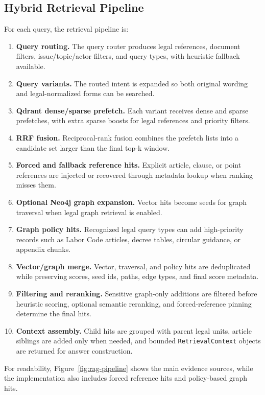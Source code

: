 \subsection{Hybrid Retrieval Pipeline}
For each query, the retrieval pipeline is:

\begin{enumerate}
  \item \textbf{Query routing.} The query router produces legal references, document filters, issue/topic/actor filters, and query types, with heuristic fallback available.
  \item \textbf{Query variants.} The routed intent is expanded so both original wording and legal-normalized forms can be searched.
  \item \textbf{Qdrant dense/sparse prefetch.} Each variant receives dense and sparse prefetches, with extra sparse boosts for legal references and priority filters.
  \item \textbf{RRF fusion.} Reciprocal-rank fusion combines the prefetch lists into a candidate set larger than the final top-k window.
  \item \textbf{Forced and fallback reference hits.} Explicit article, clause, or point references are injected or recovered through metadata lookup when ranking misses them.
  \item \textbf{Optional Neo4j graph expansion.} Vector hits become seeds for graph traversal when legal graph retrieval is enabled.
  \item \textbf{Graph policy hits.} Recognized legal query types can add high-priority records such as Labor Code articles, decree tables, circular guidance, or appendix chunks.
  \item \textbf{Vector/graph merge.} Vector, traversal, and policy hits are deduplicated while preserving scores, seed ids, paths, edge types, and final score metadata.
  \item \textbf{Filtering and reranking.} Sensitive graph-only additions are filtered before heuristic scoring, optional semantic reranking, and forced-reference pinning determine the final hits.
  \item \textbf{Context assembly.} Child hits are grouped with parent legal units, article siblings are added only when needed, and bounded \texttt{RetrievalContext} objects are returned for answer construction.
\end{enumerate}

For readability, Figure~\ref{fig:rag-pipeline} shows the main evidence sources, while the implementation also includes forced reference hits and policy-based graph hits.

